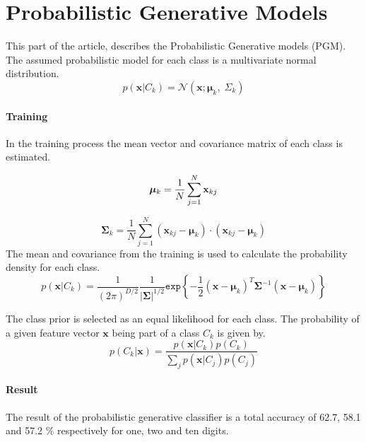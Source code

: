 \section*{Probabilistic Generative Models}
This part of the article, describes the Probabilistic Generative models (PGM).
The assumed probabilistic model for each class is a multivariate normal distribution. 
\begin{equation}
p(\mathbf{x}|C_k)=
\mathcal{N}(\mathbf{x};\mathbf{\mu}_k, \; \Sigma_k) 
\label{eq:gauss_dist} 
\end{equation}

\paragraph*{Training}
In the training process the mean vector and covariance matrix of each class is estimated.

\begin{equation}
\bm{\mu}_k= \dfrac{1}{N} \sum_{j=1}^{N} \mathbf{x}_{kj} \\
\end{equation}

\begin{equation}
\bm{\Sigma}_k =
\dfrac{1}{N} 
\sum_{j=1}^{N} 
	(\mathbf{x}_{kj}-\bm{\mu}_k) 
	\cdot 
	(\mathbf{x}_{kj}-\bm{\mu}_k)
\end{equation}
The mean and covariance from the training is used to calculate the probability density for each class.
\begin{equation}
p(\mathbf{x}|C_k)=  
\dfrac{1}{(2\pi)^{D/2}} \dfrac{1}{\left|\mathbf{\Sigma} \right|^{1/2}} 
\mathtt{exp} \left\lbrace -\dfrac{1}{2} (\mathbf{x}-\bm{\mu}_k)^T \mathbf{\Sigma}^{-1} (\mathbf{x}-\bm{\mu}_k) \right\rbrace
\end{equation}

The class prior is selected as an equal likelihood for each class. The probability of a given feature vector $ \mathbf{x} $ being part of a class $ C_k $ is given by.
\begin{equation}
p(C_k |\mathbf{x}) =
\dfrac{p(\mathbf{x}|C_k) p(C_k)}
{\sum_j p(\mathbf{x}|C_j) p(C_j)}
\end{equation}

\paragraph*{Result}
The result of the probabilistic generative classifier is a total accuracy of 62.7, 58.1 and 57.2 \% respectively for one, two and ten digits. 